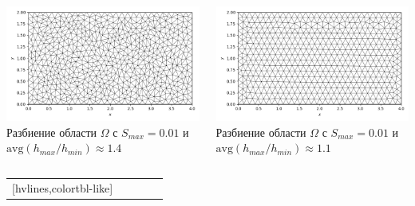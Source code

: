 \documentclass[ignoreonframetext,xcolor=table, unicode, 10pt]{beamer}
\begin{document}
\begin{frame}{}
	\small
	\vspace*{2mm}
	\begin{columns}
		\centering
		\includegraphics[width=1\columnwidth]{rect_dirichlet_only_001_net.png}\\ 
		\vspace*{-2mm}
		Разбиение области $\Omega$ с $S_{max} = 0.01$ и 
		$\mathrm{avg} \left( h_{max} / h_{min} \right) \approx 1.4 $
		
		\centering
		\includegraphics[width=1\columnwidth]{rect_dirichlet_only_001_calfem_net.png}
		\\
		\vspace*{-2mm}
		Разбиение области $\Omega$ с $S_{max} = 0.01$ и 
		$\mathrm{avg} \left( h_{max} / h_{min} \right) \approx 1.1$
	\end{columns}
	
	
	\normalsize
	\vspace*{0mm}
	\begin{table}
	\begin{NiceTabular}{|c|c|c|c|c|}[hvlines,colortbl-like]
		

\end{NiceTabular}
\end{table}
\end{frame}
\end{document}
